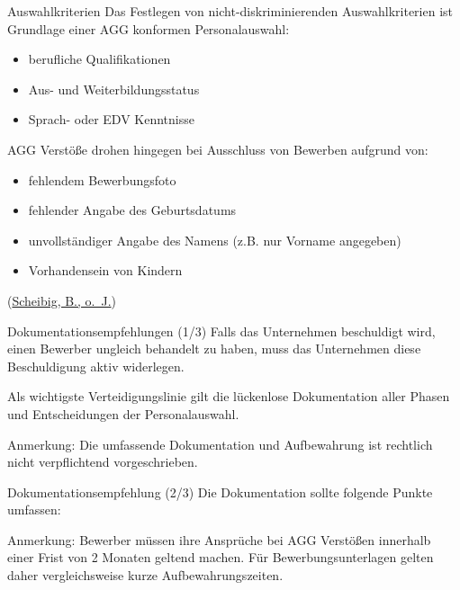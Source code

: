 \documentclass[
  10pt,
  ignorenonframetext,
]{beamer}
\providecommand{\tightlist}{%
  \setlength{\itemsep}{0pt}\setlength{\parskip}{0pt}}
\begin{document}
\begin{frame}{Auswahlkriterien}
\protect\hypertarget{auswahlkriterien}{}
Das Festlegen von nicht-diskriminierenden Auswahlkriterien ist Grundlage
einer AGG konformen Personalauswahl:

\begin{itemize}
\tightlist
\item
  berufliche Qualifikationen
\item
  Aus- und Weiterbildungsstatus
\item
  Sprach- oder EDV Kenntnisse
\end{itemize}

AGG Verstöße drohen hingegen bei Ausschluss von Bewerben aufgrund von:

\begin{itemize}
\tightlist
\item
  fehlendem Bewerbungsfoto
\item
  fehlender Angabe des Geburtsdatums
\item
  unvollständiger Angabe des Namens (z.B. nur Vorname angegeben)
\item
  Vorhandensein von Kindern
\end{itemize}

(\protect\hyperlink{ref-ihk_wsb}{Scheibig, B., o.~J.})
\end{frame}

\begin{frame}{Dokumentationsempfehlungen (1/3)}
\protect\hypertarget{dokumentationsempfehlungen-13}{}
Falls das Unternehmen beschuldigt wird, einen Bewerber ungleich
behandelt zu haben, muss das Unternehmen diese Beschuldigung aktiv
widerlegen.

Als wichtigste Verteidigungslinie gilt die lückenlose Dokumentation
aller Phasen und Entscheidungen der Personalauswahl.

Anmerkung: Die umfassende Dokumentation und Aufbewahrung ist rechtlich
nicht verpflichtend vorgeschrieben.
\end{frame}

\begin{frame}{Dokumentationsempfehlung (2/3)}
\protect\hypertarget{dokumentationsempfehlung-23}{}
Die Dokumentation sollte folgende Punkte umfassen:


Anmerkung: Bewerber müssen ihre Ansprüche bei AGG Verstößen innerhalb
einer Frist von 2 Monaten geltend machen. Für Bewerbungsunterlagen
gelten daher vergleichsweise kurze Aufbewahrungszeiten.
\end{frame}
\end{document}
